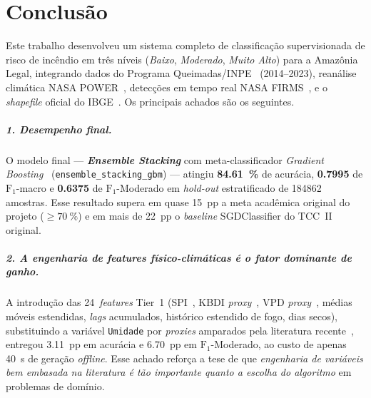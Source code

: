 %

\chapter{Conclusão}
\label{cap:conclusao}

Este trabalho desenvolveu um sistema completo de classificação supervisionada de risco de incêndio em três níveis (\emph{Baixo}, \emph{Moderado}, \emph{Muito Alto}) para a Amazônia Legal, integrando dados do Programa Queimadas/INPE~\cite{INPE24} (2014--2023), reanálise climática NASA POWER~\cite{nasapower}, detecções em tempo real NASA FIRMS~\cite{nasafirms}, e o \emph{shapefile} oficial do IBGE~\cite{ibgeamazonia2024}. Os principais achados são os seguintes.

\paragraph{1. Desempenho final.} O modelo final --- \textbf{\emph{Ensemble Stacking}} com meta-classificador \emph{Gradient Boosting}~\cite{friedman2001greedy,wolpert1992stacked} (\texttt{ensemble\_stacking\_gbm}) --- atingiu \textbf{\SI{84,61}{\percent}} de acurácia, \textbf{\num{0,7995}} de \(\text{F}_1\)-macro e \textbf{\num{0,6375}} de \(\text{F}_1\)-Moderado em \emph{hold-out} estratificado de \num{184862} amostras. Esse resultado supera em quase \SI{15}{pp} a meta acadêmica original do projeto (\(\geq \SI{70}{\percent}\)) e em mais de \SI{22}{pp} o \emph{baseline} SGDClassifier do TCC~II original.

\paragraph{2. A engenharia de \emph{features} físico-climáticas é o fator dominante de ganho.} A introdução das 24~\emph{features} Tier~1 (SPI~\cite{mckee1993spi}, KBDI \emph{proxy}~\cite{keetch1968drought}, VPD \emph{proxy}~\cite{seager2015climatology}, médias móveis estendidas, \emph{lags} acumulados, histórico estendido de fogo, dias secos), substituindo a variável \texttt{Umidade} por \emph{proxies} amparados pela literatura recente~\cite{seager2015climatology,forests2024cerradoamazon,npjhazards2025fire}, entregou \SI{+3,11}{pp} em acurácia e \SI{+6,70}{pp} em \(\text{F}_1\)-Moderado, ao custo de apenas \SI{40}{\second} de geração \emph{offline}. Esse achado reforça a tese de que \emph{engenharia de variáveis bem embasada na literatura é tão importante quanto a escolha do algoritmo} em problemas de domínio.

